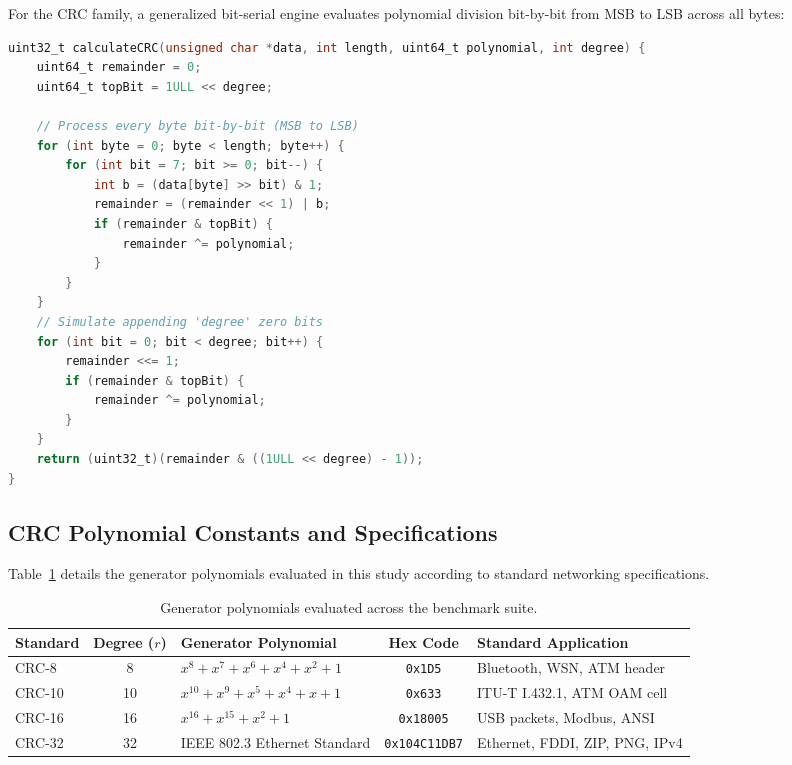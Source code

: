 \documentclass[11pt,a4paper]{article}
\begin{document}
For the CRC family, a generalized bit-serial engine evaluates polynomial division bit-by-bit from MSB to LSB across all bytes:

\begin{lstlisting}[language=C, caption={Bitwise Modulo-2 Polynomial Division Engine (\texttt{crc.c})}]
uint32_t calculateCRC(unsigned char *data, int length, uint64_t polynomial, int degree) {
    uint64_t remainder = 0;
    uint64_t topBit = 1ULL << degree;

    // Process every byte bit-by-bit (MSB to LSB)
    for (int byte = 0; byte < length; byte++) {
        for (int bit = 7; bit >= 0; bit--) {
            int b = (data[byte] >> bit) & 1;
            remainder = (remainder << 1) | b;
            if (remainder & topBit) {
                remainder ^= polynomial;
            }
        }
    }
    // Simulate appending 'degree' zero bits
    for (int bit = 0; bit < degree; bit++) {
        remainder <<= 1;
        if (remainder & topBit) {
            remainder ^= polynomial;
        }
    }
    return (uint32_t)(remainder & ((1ULL << degree) - 1));
}
\end{lstlisting}

\subsection{CRC Polynomial Constants and Specifications}

Table~\ref{tab:polynomials} details the generator polynomials evaluated in this study according to standard networking specifications.

\begin{table}[H]
    \centering
    \small
    \setlength{\tabcolsep}{3.5pt}
    \begin{tabular}{lclcp{4.0cm}}
        \toprule
        \textbf{Standard} & \textbf{Degree ($r$)} & \textbf{Generator Polynomial} & \textbf{Hex Code} & \textbf{Standard Application} \\
        \midrule
        CRC-8  & 8  & $x^8 + x^7 + x^6 + x^4 + x^2 + 1$ & \texttt{0x1D5} & Bluetooth, WSN, ATM header \\
        CRC-10 & 10 & $x^{10} + x^9 + x^5 + x^4 + x + 1$ & \texttt{0x633} & ITU-T I.432.1, ATM OAM cell \\
        CRC-16 & 16 & $x^{16} + x^{15} + x^2 + 1$        & \texttt{0x18005} & USB packets, Modbus, ANSI \\
        CRC-32 & 32 & IEEE 802.3 Ethernet Standard       & \texttt{0x104C11DB7} & Ethernet, FDDI, ZIP, PNG, IPv4 \\
        \bottomrule
    \end{tabular}
    \caption{Generator polynomials evaluated across the benchmark suite.}
    \label{tab:polynomials}
\end{table}
\end{document}
